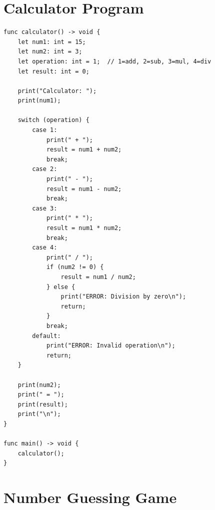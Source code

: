 \documentclass[12pt,a4paper,oneside]{book}
\begin{document}
\section{Calculator Program}

\begin{lstlisting}[style=algo, caption={Simple Calculator}]
func calculator() -> void {
    let num1: int = 15;
    let num2: int = 3;
    let operation: int = 1;  // 1=add, 2=sub, 3=mul, 4=div
    let result: int = 0;
    
    print("Calculator: ");
    print(num1);
    
    switch (operation) {
        case 1:
            print(" + ");
            result = num1 + num2;
            break;
        case 2:
            print(" - ");
            result = num1 - num2;
            break;
        case 3:
            print(" * ");
            result = num1 * num2;
            break;
        case 4:
            print(" / ");
            if (num2 != 0) {
                result = num1 / num2;
            } else {
                print("ERROR: Division by zero\n");
                return;
            }
            break;
        default:
            print("ERROR: Invalid operation\n");
            return;
    }
    
    print(num2);
    print(" = ");
    print(result);
    print("\n");
}

func main() -> void {
    calculator();
}
\end{lstlisting}

\section{Number Guessing Game}
\end{document}
